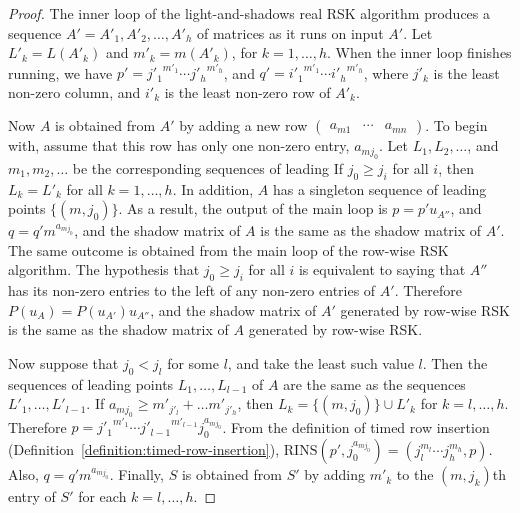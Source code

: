 \documentclass[10pt]{amsproc}
\theoremstyle{definition}
\theoremstyle{remark}
\newcommand{\rowins}{\mathrm{RINS}}
\begin{document}
\begin{proof}
  The inner loop of the light-and-shadows real RSK algorithm produces a sequence $A'=A'_1, A'_2,\dotsc, A'_h$ of matrices as it runs on input $A'$.
  Let $L'_k=L(A'_k)$ and $m'_k=m(A'_k)$, for $k=1,\dotsc,h$.
  When the inner loop finishes running, we have $p'={j'_1}^{m'_1}\dotsb {j'_h}^{m'_h}$, and $q' = {i'_1}^{m'_1}\dotsb {i'_h}^{m'_h}$, where $j'_k$ is the least non-zero column, and $i'_k$ is the least non-zero row of $A'_k$.


  Now $A$ is obtained from $A'$ by adding a new row
  $
  \begin{pmatrix}
    a_{m1}&\dotsb & a_{mn}
  \end{pmatrix}
  $.
  To begin with, assume that this row has only one non-zero entry, $a_{mj_0}$.
  Let $L_1,L_2,\dotsc$, and $m_1,m_2,\dotsc$ be the corresponding sequences of leading 
  If $j_0\geq j_i$ for all $i$, then $L_k=L'_k$ for all $k=1,\dotsc,h$.
  In addition, $A$ has a singleton sequence of leading points $\{(m,j_0)\}$.
  As a result, the output of the main loop is $p=p'u_{A''}$, and $q=q'm^{a_{mj_0}}$, and the shadow matrix of $A$ is the same as the shadow matrix of $A'$.
  The same outcome is obtained from the main loop of the row-wise RSK algorithm.
  The hypothesis that $j_0\geq j_i$ for all $i$ is equivalent to saying that $A''$ has its non-zero entries to the left of any non-zero entries of $A'$.
  Therefore $P(u_A)=P(u_{A'})u_{A''}$, and the shadow matrix of $A'$ generated by row-wise RSK is the same as the shadow matrix of $A$ generated by row-wise RSK.
  
  Now suppose that $j_0<j_l$ for some $l$, and take the least such value $l$.
  Then the sequences of leading points $L_1,\dotsc,L_{l-1}$ of $A$ are the same as the sequences $L'_1,\dotsc,L'_{l-1}$.
  If $a_{mj_0}\geq m'_{j'_l}+\dots m'_{j'_h}$, then $L_k=\{(m,j_0)\}\cup L'_k$ for $k=l,\dotsc, h$.
  Therefore $p={j'_1}^{m'_1}\dotsb {j'_{l-1}}^{m'_{l-1}}j_0^{a_{mj_0}}$.
  From the definition of timed row insertion (Definition~\ref{definition:timed-row-insertion}), $\rowins(p',j_0^{a_{mj_0}}) = (j_l^{m_l}\dotsb j_h^{m_h},p)$.
  Also, $q=q'm^{a_{mj_0}}$.
  Finally, $S$ is obtained from $S'$ by adding $m'_k$ to the $(m,j_k)$th entry of $S'$ for each $k=l,\dotsc,h$.


\end{proof}
\end{document}
